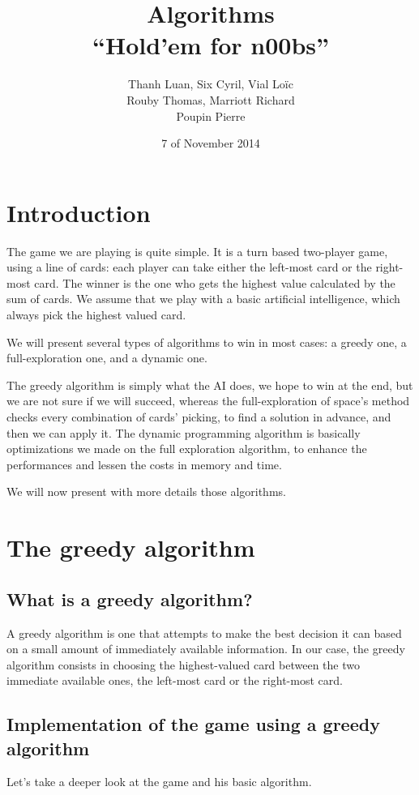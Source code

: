 \documentclass[11pt]{article}
\title{Algorithms \\
	\textbf{``Hold'em for n00bs''}}
\author{Thanh Luan, Six Cyril, Vial Loïc \\
			Rouby Thomas, Marriott Richard\\
			Poupin Pierre}
\date{7\up{th} of November 2014}
\begin{document}
\maketitle

\section{Introduction}
The game we are playing is quite simple. It is a turn based two-player game, using a line of cards: each player can take either the left-most card or the right-most card.
The winner is the one who gets the highest value calculated by the sum of cards.
We assume that we play with a basic artificial intelligence, which always pick the highest valued card.

We will present several types of algorithms to win in most cases: a greedy one, a full-exploration one, and a dynamic one.

The greedy algorithm is simply what the AI does, we hope to win at the end, but we are not sure if we will succeed, whereas the full-exploration of space's method checks every combination of cards' picking, to find a solution in advance, and then we can apply it.
The dynamic programming algorithm is basically optimizations we made on the full exploration algorithm, to enhance the performances and lessen the costs in memory and time.

We will now present with more details those algorithms.


\section{The greedy algorithm}
\subsection{What is a greedy algorithm?}

A greedy algorithm is one that attempts to make the best decision it can based on a small amount of immediately available information.
In our case, the greedy algorithm consists in  choosing the highest-valued card between the two immediate available ones, the left-most card or the right-most card.

\subsection{Implementation of the game using a greedy algorithm}
Let's take a deeper look at the game and his basic algorithm.
\end{document}
